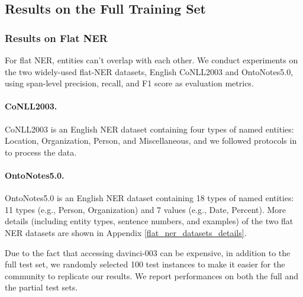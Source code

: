 \documentclass{article}
\begin{document}
\subsection{Results on the Full Training Set}

\subsubsection{Results on Flat NER}
For flat NER, entities can't overlap with each other. 
We conduct experiments on the two widely-used flat-NER datasets, English CoNLL2003 and OntoNotes5.0, using span-level precision, recall, and F1 score as evaluation metrics.

\paragraph{CoNLL2003.} CoNLL2003 \citep{sang2003introduction} is an English NER dataset containing four types of named entities: Location, Organization, Person, and Miscellaneous, and we followed protocols in \citet{li2019unified,ma2016end} to process the data.

\paragraph{OntoNotes5.0.} OntoNotes5.0 \citep{pradhan2013towards} is an English NER dataset containing 18 types of named entities: 11 types (e.g., Person, Organization) and 7 values (e.g., Date, Percent).
More details (including entity types, sentence numbers, and examples) of the two flat NER datasets are shown in Appendix \ref{flat_ner_datasets_details}.

Due to the fact that accessing davinci-003 can be expensive, in addition to the full test set, we randomly selected 100 test instances to make it easier for the community to replicate our results. We report performances on both the full and the partial test sets. 
\end{document}
